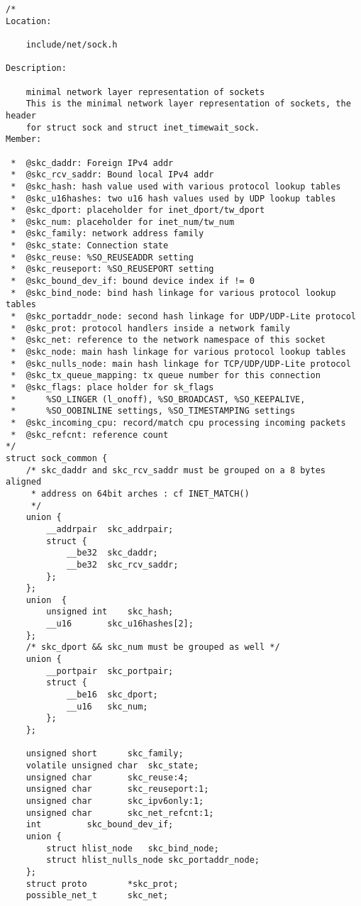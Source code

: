\begin{verbatim}
/*
Location:

	include/net/sock.h

Description:

	minimal network layer representation of sockets
	This is the minimal network layer representation of sockets, the header
	for struct sock and struct inet_timewait_sock.
Member:

 *  @skc_daddr: Foreign IPv4 addr
 *  @skc_rcv_saddr: Bound local IPv4 addr
 *  @skc_hash: hash value used with various protocol lookup tables
 *  @skc_u16hashes: two u16 hash values used by UDP lookup tables
 *  @skc_dport: placeholder for inet_dport/tw_dport
 *  @skc_num: placeholder for inet_num/tw_num
 *  @skc_family: network address family
 *  @skc_state: Connection state
 *  @skc_reuse: %SO_REUSEADDR setting
 *  @skc_reuseport: %SO_REUSEPORT setting
 *  @skc_bound_dev_if: bound device index if != 0
 *  @skc_bind_node: bind hash linkage for various protocol lookup tables
 *  @skc_portaddr_node: second hash linkage for UDP/UDP-Lite protocol
 *  @skc_prot: protocol handlers inside a network family
 *  @skc_net: reference to the network namespace of this socket
 *  @skc_node: main hash linkage for various protocol lookup tables
 *  @skc_nulls_node: main hash linkage for TCP/UDP/UDP-Lite protocol
 *  @skc_tx_queue_mapping: tx queue number for this connection
 *  @skc_flags: place holder for sk_flags
 *      %SO_LINGER (l_onoff), %SO_BROADCAST, %SO_KEEPALIVE,
 *      %SO_OOBINLINE settings, %SO_TIMESTAMPING settings
 *  @skc_incoming_cpu: record/match cpu processing incoming packets
 *  @skc_refcnt: reference count
*/
struct sock_common {
    /* skc_daddr and skc_rcv_saddr must be grouped on a 8 bytes aligned
     * address on 64bit arches : cf INET_MATCH()
     */
    union {
        __addrpair  skc_addrpair;
        struct {
            __be32  skc_daddr;
            __be32  skc_rcv_saddr;
        };
    };
    union  {
        unsigned int    skc_hash;
        __u16       skc_u16hashes[2];
    };
    /* skc_dport && skc_num must be grouped as well */
    union {
        __portpair  skc_portpair;
        struct {
            __be16  skc_dport;
            __u16   skc_num;
        };
    };

    unsigned short      skc_family;
    volatile unsigned char  skc_state;
    unsigned char       skc_reuse:4;
    unsigned char       skc_reuseport:1;
    unsigned char       skc_ipv6only:1;
    unsigned char       skc_net_refcnt:1;
    int         skc_bound_dev_if;
    union {
        struct hlist_node   skc_bind_node;
        struct hlist_nulls_node skc_portaddr_node;
    };
    struct proto        *skc_prot;
    possible_net_t      skc_net;


\end{verbatim}
